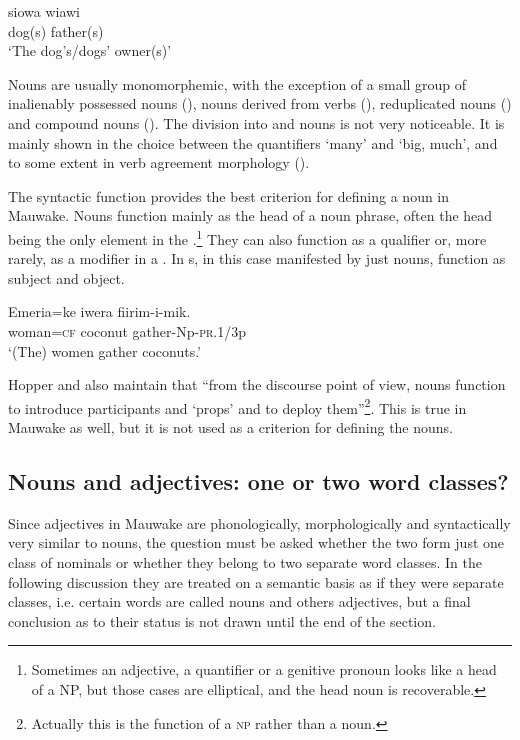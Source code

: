 \ea%
\label{ex:3:x1}
\gll siowa wiawi\\
dog(s) father(s)\\
\glt`The dog's/dogs' owner(s)'
\z

Nouns are usually monomorphemic, with the exception of a small group of inalienably possessed nouns (), nouns derived from verbs (), reduplicated nouns () and compound nouns (). The division into  and  nouns is not very noticeable. It is mainly shown in the choice between the quantifiers  `many' and  `big, much', and to some extent in verb agreement morphology ().

The syntactic function provides the best criterion for defining a noun in Mauwake. Nouns function mainly as the head of a noun phrase, often the head being the only element in the .\footnote{Sometimes an adjective, a quantifier or a genitive pronoun looks like a head of a NP, but those cases are elliptical, and the head noun is recoverable.} They can also function as a qualifier or, more rarely, as a modifier in a . In  s, in this case manifested by just nouns, function as subject and object.

\ea%
\label{ex:3:x2}
\gll Emeria=ke iwera fiirim-i-mik.\\
 woman=\textsc{cf} coconut gather-Np-\textsc{pr}.1/3p\\
\glt`(The) women gather coconuts.'
\z

Hopper and \citet[710]{HopperEtAl1984} also maintain that {``from the discourse point of view, nouns function to introduce participants and `props' and to deploy them''}\footnote{Actually this is the function of a \textsc{np} rather than a noun.}{.} This is true in Mauwake as well, but it is not used as a criterion for defining the nouns.

\subsection{Nouns and adjectives: one or two word classes?}\label{sec:3.2.2}
{}
Since adjectives in Mauwake are phonologically, morphologically and syntactically very similar to nouns, the question must be asked whether the two form just one class of nominals or whether they belong to two separate word classes. In the following discussion they are treated on a semantic basis as if they were separate classes, i.e. certain words are called nouns and others adjectives, but a final conclusion as to their status is not drawn until the end of the section.

